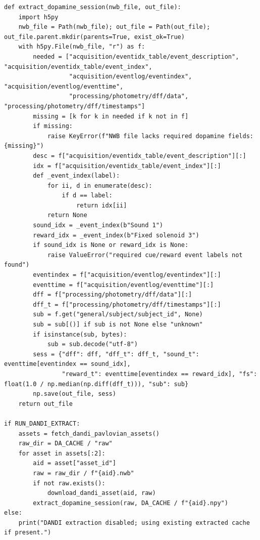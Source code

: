 \begin{lstlisting}[caption={05\_biological\_grounding.ipynb code cell 2},label={lst:mrl-nb-05-biological-grounding-2}]
def extract_dopamine_session(nwb_file, out_file):
    import h5py
    nwb_file = Path(nwb_file); out_file = Path(out_file); out_file.parent.mkdir(parents=True, exist_ok=True)
    with h5py.File(nwb_file, "r") as f:
        needed = ["acquisition/eventidx_table/event_description", "acquisition/eventidx_table/event_index",
                  "acquisition/eventlog/eventindex", "acquisition/eventlog/eventtime",
                  "processing/photometry/dff/data", "processing/photometry/dff/timestamps"]
        missing = [k for k in needed if k not in f]
        if missing:
            raise KeyError(f"NWB file lacks required dopamine fields: {missing}")
        desc = f["acquisition/eventidx_table/event_description"][:]
        idx = f["acquisition/eventidx_table/event_index"][:]
        def _event_index(label):
            for ii, d in enumerate(desc):
                if d == label:
                    return idx[ii]
            return None
        sound_idx = _event_index(b"Sound 1")
        reward_idx = _event_index(b"Fixed solenoid 3")
        if sound_idx is None or reward_idx is None:
            raise ValueError("required cue/reward event labels not found")
        eventindex = f["acquisition/eventlog/eventindex"][:]
        eventtime = f["acquisition/eventlog/eventtime"][:]
        dff = f["processing/photometry/dff/data"][:]
        dff_t = f["processing/photometry/dff/timestamps"][:]
        sub = f.get("general/subject/subject_id", None)
        sub = sub[()] if sub is not None else "unknown"
        if isinstance(sub, bytes):
            sub = sub.decode("utf-8")
        sess = {"dff": dff, "dff_t": dff_t, "sound_t": eventtime[eventindex == sound_idx],
                "reward_t": eventtime[eventindex == reward_idx], "fs": float(1.0 / np.median(np.diff(dff_t))), "sub": sub}
        np.save(out_file, sess)
    return out_file

if RUN_DANDI_EXTRACT:
    assets = fetch_dandi_pavlovian_assets()
    raw_dir = DA_CACHE / "raw"
    for asset in assets[:2]:
        aid = asset["asset_id"]
        raw = raw_dir / f"{aid}.nwb"
        if not raw.exists():
            download_dandi_asset(aid, raw)
        extract_dopamine_session(raw, DA_CACHE / f"{aid}.npy")
else:
    print("DANDI extraction disabled; using existing extracted cache if present.")
\end{lstlisting}

